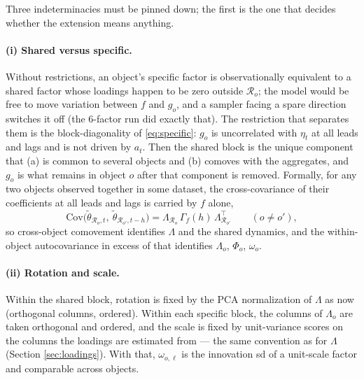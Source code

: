 \documentclass[11pt]{article}
\begin{document}
Three indeterminacies must be pinned down; the first is the one that decides
whether the extension means anything.

\paragraph{(i) Shared versus specific.} Without restrictions, an object's
specific factor is observationally equivalent to a shared factor whose loadings
happen to be zero outside $\mathcal{R}_o$; the model would be free to move
variation between $f$ and $g_o$, and a sampler facing a spare direction switches
it off (the 6-factor run did exactly that). The restriction that separates them
is the block-diagonality of \eqref{eq:specific}: $g_o$ is uncorrelated with
$\eta_t$ at all leads and lags and is not driven by $a_t$. Then the shared block
is the unique component that (a) is common to several objects and (b) comoves
with the aggregates, and $g_o$ is what remains in object $o$ after that
component is removed. Formally, for any two objects observed together in some
dataset, the cross-covariance of their coefficients at all leads and lags is
carried by $f$ alone,
\begin{equation}
  \mathrm{Cov}\bigl(\tilde\theta_{\mathcal{R}_o,t},\ \tilde\theta_{\mathcal{R}_{o'},t-h}\bigr)
  = \Lambda_{\mathcal{R}_o}\,\Gamma_f(h)\,\Lambda_{\mathcal{R}_{o'}}^{\top}
  \qquad (o\ne o'),
\end{equation}
so cross-object comovement identifies $\Lambda$ and the shared dynamics, and
the within-object autocovariance in excess of that identifies $\Lambda_o$,
$\Phi_o$, $\omega_o$.

\paragraph{(ii) Rotation and scale.} Within the shared block, rotation is fixed
by the PCA normalization of $\Lambda$ as now (orthogonal columns, ordered).
Within each specific block, the columns of $\Lambda_o$ are taken orthogonal and
ordered, and the scale is fixed by unit-variance scores on the columns the
loadings are estimated from --- the same convention as for $\Lambda$ (Section
\ref{sec:loadings}). With that, $\omega_{o,\ell}$ is the innovation sd of a
unit-scale factor and comparable across objects.
\end{document}
